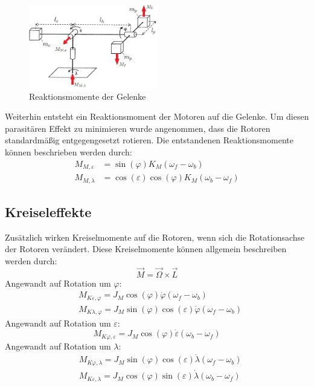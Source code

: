 \documentclass[times, 10pt,twocolumn]{article}
\begin{document}
	\begin{figure}[ht]
	\centering
	\includegraphics[width=0.5\textwidth]{images/setup_mom}
	\caption{Reaktionsmomente der Gelenke}
	\label{setup_mom}
	\end{figure}
	Weiterhin entsteht ein Reaktionsmoment der Motoren auf die Gelenke. Um diesen parasitären Effekt zu minimieren wurde angenommen, dass die Rotoren standardmäßig entgegengesetzt rotieren. Die entstandenen Reaktionsmomente können beschrieben werden durch:
	\begin{align}
	M_{M,\varepsilon} &=\sin (\varphi) K_M (\omega_f-\omega_b) \\
	M_{M,\lambda} &=\cos (\varepsilon) \cos (\varphi) K_M (\omega_b-\omega_f)
	\end{align}

	\subsection{Kreiseleffekte}

	Zusätzlich wirken Kreiselmomente auf die Rotoren, wenn sich die Rotationsachse der Rotoren verändert. Diese Kreiselmomente können allgemein beschreiben werden durch:
	\begin{equation}
	\vec{M} = \vec{\Omega} \times \vec{L}
	\end{equation}	
	Angewandt auf Rotation um $\varphi$:
	\begin{align}
	&M_{K\varepsilon,\varphi} = J_M \cos (\varphi) \dot{\varphi}(\omega_f-\omega_b)\\
	&M_{K\lambda,\varphi} = J_M \sin (\varphi) \cos (\varepsilon) \dot{\varphi}(\omega_f-\omega_b)
	\end{align}
	Angewandt auf Rotation um $\varepsilon$:
	\begin{equation}
	M_{K\varphi,\varepsilon} = J_M \cos (\varphi) \dot{\varepsilon}(\omega_b-\omega_f)
	\end{equation}
	Angewandt auf Rotation um $\lambda$:
	\begin{align}
	&M_{K\varphi,\lambda} = J_M \sin (\varphi) \cos (\varepsilon) \dot{\lambda}(\omega_f-\omega_b)\\
	&M_{K\varepsilon,\lambda} = J_M \cos (\varphi) \sin (\varepsilon) \dot{\lambda}(\omega_b-\omega_f)
	\end{align}
\end{document}
